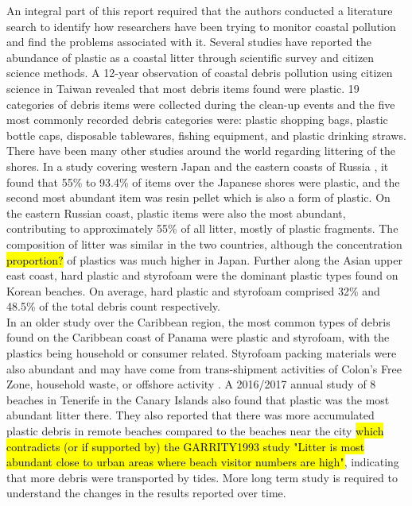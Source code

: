 \documentclass[10pt]{article}\usepackage[]{graphicx}\usepackage[]{color}
\begin{document}
An integral part of this report required that the authors conducted a literature search to identify how researchers have been trying to monitor coastal pollution and find the problems associated with it. Several studies have reported the abundance of plastic as a coastal litter through scientific survey and citizen science methods. A 12-year observation of coastal debris pollution using citizen science in Taiwan revealed that most debris items found were plastic. \cite{WALTHER2018} 19 categories of debris items were collected during the clean-up events and the five most commonly recorded debris categories were: plastic shopping bags, plastic bottle caps, disposable tablewares, fishing equipment, and plastic drinking straws. There have been many other studies around the world regarding littering of the shores. In a study covering western Japan and the eastern coasts of Russia \cite{KUSUI2003}, it found that 55\% to 93.4\% of items over the Japanese shores were plastic, and the second most abundant item was resin pellet which is also a form of plastic. On the eastern Russian coast, plastic items were also the most abundant, contributing to approximately 55\% of all litter, mostly of plastic fragments. The composition of litter was similar in the two countries, although the concentration \hl{proportion?} of plastics was much higher in Japan. \cite{KUSUI2003} Further along the Asian upper east coast, hard plastic and styrofoam were the dominant plastic types found on Korean beaches. On average, hard plastic and styrofoam comprised 32\% and 48.5\% of the total debris count respectively. \\

In an older study over the Caribbean region, the most common types of debris found on the Caribbean coast of Panama were plastic and styrofoam, with the plastics being household or consumer related. Styrofoam packing materials were also abundant and may have come from trans-shipment activities of Colon's Free Zone, household waste, or offshore activity \cite{GARRITY1993}. A 2016/2017 annual study of 8 beaches in Tenerife in the Canary Islands also found that plastic was the most abundant litter there. They also reported that there was more accumulated plastic debris in remote beaches compared to the beaches near the city \hl{ which contradicts (or if supported by) the GARRITY1993 study "Litter is most abundant close to urban areas where beach visitor numbers are high"}, indicating that more debris were transported by tides. More long term study is required to understand the changes in the results reported over time. \cite{REINOLD2020} \\
\end{document}
